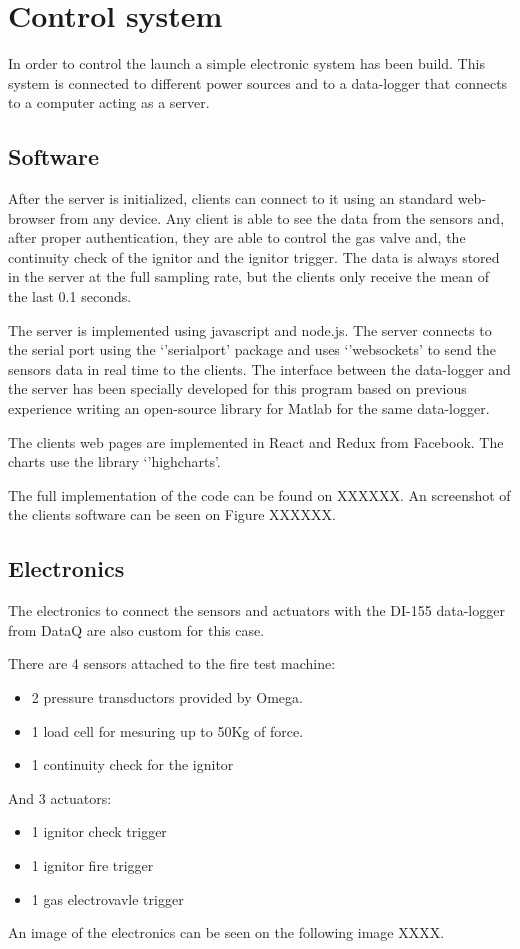 
\section*{Control system}

In order to control the launch a simple electronic system has been build. This system is connected to different power sources and to a data-logger that connects to a computer acting as a server.

\subsection{Software}

After the server is initialized, clients can connect to it using an standard web-browser from any device. Any client is able to see the data from the sensors and, after proper authentication, they are able to control the gas valve and, the continuity check of the ignitor and the ignitor trigger. The data is always stored in the server at the full sampling rate, but the clients only receive the mean of the last 0.1 seconds.

The server is implemented using javascript and node.js. The server connects to the serial port using the `'serialport' package and uses `'websockets' to send the sensors data in real time to the clients. The interface between the data-logger and the server has been specially developed for this program based on previous experience writing an open-source library for Matlab for the same data-logger.

The clients web pages are implemented in React and Redux from Facebook. The charts use the library `'highcharts'.

The full implementation of the code can be found on XXXXXX. An screenshot of the clients software can be seen on Figure XXXXXX.

\subsection{Electronics}

The electronics to connect the sensors and actuators with the DI-155 data-logger from DataQ are also custom for this case.

There are 4 sensors attached to the fire test machine:
\begin{itemize}
  \item 2 pressure transductors provided by Omega.
  \item 1 load cell for mesuring up to 50Kg of force.
  \item 1 continuity check for the ignitor
\end{itemize}

And 3 actuators:
\begin{itemize}
  \item 1 ignitor check trigger
  \item 1 ignitor fire trigger
  \item 1 gas electrovavle trigger
\end{itemize}

An image of the electronics can be seen on the following image XXXX.
